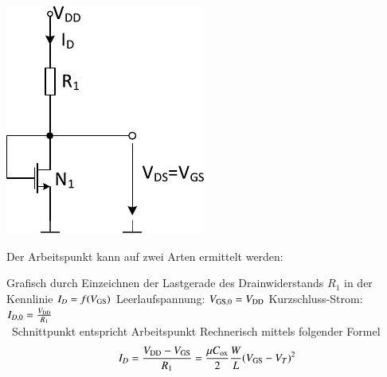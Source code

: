 \begin{minipage}[t]{0.3\columnwidth}
    \includegraphics[width=\columnwidth, align=t]{images/04_MOS_diode_mit_widerstand.pdf}
\end{minipage}
\hfill
\begin{minipage}[t]{0.66\columnwidth}
    Der Arbeitspunkt kann auf zwei Arten ermittelt werden:

    \smallskip
    
    \begin{outline}
        \1 Grafisch durch Einzeichnen der Lastgerade des Drainwiderstands $R_1$ in der Kennlinie $I_D = f(V_{\rm GS})$
            \2 Leerlaufspannung: $V_{\rm GS,0} = V_{\rm DD}$
            \2 Kurzschluss-Strom: $I_{D, 0} = \frac{V_{\rm DD}}{R_1}$ \\
            \textrightarrow\ Schnittpunkt entspricht Arbeitspunkt
            \smallskip
        \1 Rechnerisch mittels folgender Formel
        $$ I_D = \frac{V_{\rm DD} - V_{\rm GS}}{R_1} = \frac{\mu C_{\rm ox}}{2} \frac{W}{L} (V_{\rm GS} - V_T)^2 $$
    \end{outline}
\end{minipage}


